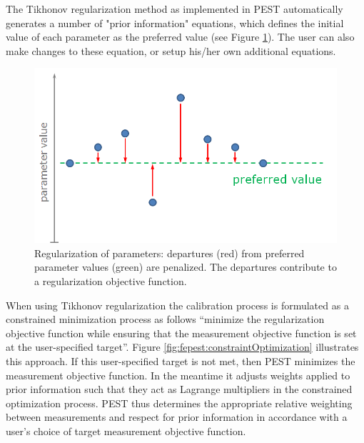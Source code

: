 The Tikhonov regularization method as implemented in PEST automatically generates a number of "prior information" equations, which defines the initial value of each parameter as the preferred value (see Figure \ref{fig:fepest:PrefferedValuesPI}). The user can also make changes to these equation, or setup his/her own additional equations.

\begin{figure}
	\center
	\includegraphics[width=\columnwidth]{figures/PrefferedValuesPI.png}
\caption{Regularization of parameters: departures (red) from preferred parameter values (green) are penalized. The departures contribute to a regularization objective function.}
\label{fig:fepest:PrefferedValuesPI}
\end{figure}

When using Tikhonov regularization the calibration process is formulated as a constrained minimization process as follows “minimize the regularization objective function while ensuring that the measurement objective function is set at the user-specified target”. Figure \ref{fig:fepest:constraintOptimization} illustrates this approach. If this user-specified target is not met, then PEST minimizes the measurement objective function. In the meantime it adjusts weights applied to prior information such that they act as Lagrange multipliers in the constrained optimization process. PEST thus determines the appropriate relative weighting between measurements and respect for prior information in accordance with a user’s choice of target measurement objective function.

